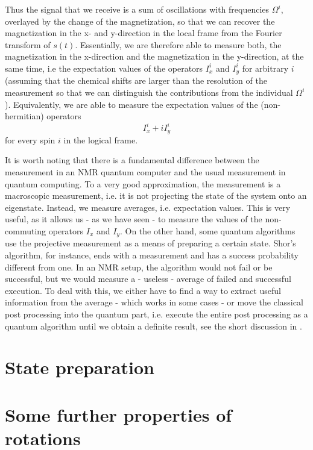 \documentclass[a4paper, draft]{article}
\theoremstyle{own}
\theoremstyle{remark}
\begin{document}
Thus the signal that we receive is a sum of oscillations with frequencies $\Omega^i$, overlayed by the change of the magnetization, so that we can recover the magnetization in the x- and y-direction in the local frame from the Fourier transform of $s(t)$. Essentially, we are therefore able to measure both, the magnetization in the x-direction and the magnetization in the y-direction, at the same time, i.e the expectation values of the operators $I_x^i$ and $I_y^i$ for arbitrary $i$ (assuming that the chemical shifts are larger than the resolution of the measurement so that we can distinguish the contributions from the individual $\Omega^i$). Equivalently, we are able to measure the expectation values of the (non-hermitian) operators
$$
I_x^i + i I_y^i
$$
for every spin $i$ in the logical frame.

It is worth noting that there is a fundamental difference between the measurement in an NMR quantum computer and the usual measurement in quantum computing. To a very good approximation, the measurement is a macroscopic measurement, i.e. it is not projecting the state of the system onto an eigenstate. Instead, we measure averages, i.e. expectation values. This is very useful, as it allows us - as we have seen - to measure the values of the non-commuting operators $I_x$ and $I_y$. On the other hand, some quantum algorithms use the projective measurement as a means of preparing a certain state. Shor's algorithm, for instance, ends with a measurement and has a success probability different from one. In an NMR setup, the algorithm would not fail or be successful, but we would measure a - useless - average of failed and successful execution. To deal with this, we either have to find a way to extract useful information from the average - which works in some cases - or move the classical post processing into the quantum part, i.e. execute the entire post processing as a quantum algorithm until we obtain a definite result, see the short discussion in \cite{ShorNMR}. 


\section{State preparation}


\appendix

\section{Some further properties of rotations}\label{app:rotations}
\end{document}
